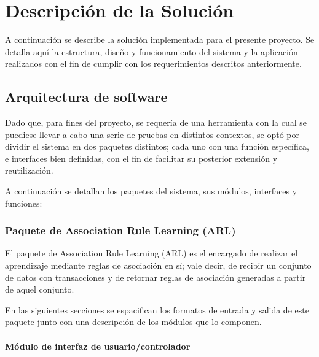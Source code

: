 \chapter{Descripción de la Solución}


A continuación se describe la solución implementada para el presente proyecto. Se detalla aquí la estructura, diseño y funcionamiento del sistema y la aplicación realizados con el fin de cumplir con los requerimientos descritos anteriormente.

\section{Arquitectura de software}

Dado que, para fines del proyecto, se requería de una herramienta con la cual se puediese llevar a cabo una serie de pruebas en distintos contextos, se optó por dividir el sistema en dos paquetes distintos; cada uno con una función específica, e interfaces bien definidas, con el fin de facilitar su posterior extensión y reutilización.


A continuación se detallan los paquetes del sistema, sus módulos, interfaces y funciones:

\subsection{Paquete de Association Rule Learning (ARL)}

El paquete de Association Rule Learning (ARL) es el encargado de realizar el aprendizaje mediante reglas de asociación en sí; vale decir, de recibir un conjunto de datos con transacciones y de retornar reglas de asociación generadas a partir de aquel conjunto.

En las siguientes secciones se espacifican los formatos de entrada y salida de este paquete junto con una descripción de los módulos que lo componen.

\subsubsection{Módulo de interfaz de usuario/controlador}


